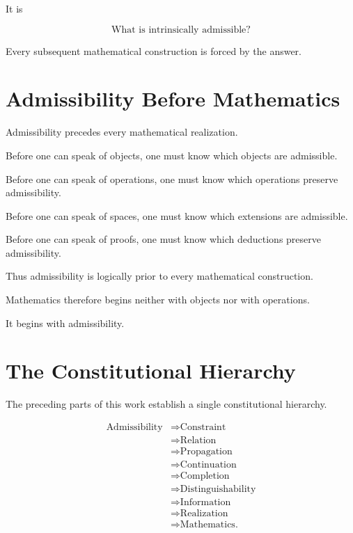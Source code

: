 \documentclass[13pt,openany]{book}
\theoremstyle{plain}
\theoremstyle{definition}
\begin{document}
It is

\[
\boxed{
\text{What is intrinsically admissible?}
}
\]

Every subsequent mathematical construction is forced by the answer.

\section{Admissibility Before Mathematics}

Admissibility precedes every mathematical realization.

Before one can speak of objects, one must know which objects are admissible.

Before one can speak of operations, one must know which operations preserve
admissibility.

Before one can speak of spaces, one must know which extensions are admissible.

Before one can speak of proofs, one must know which deductions preserve
admissibility.

Thus admissibility is logically prior to every mathematical construction.

Mathematics therefore begins neither with objects nor with operations.

It begins with admissibility.

\section{The Constitutional Hierarchy}

The preceding parts of this work establish a single constitutional hierarchy.

\[
\boxed{
\begin{aligned}
\text{Admissibility}
&\Longrightarrow
\text{Constraint}\\
&\Longrightarrow
\text{Relation}\\
&\Longrightarrow
\text{Propagation}\\
&\Longrightarrow
\text{Continuation}\\
&\Longrightarrow
\text{Completion}\\
&\Longrightarrow
\text{Distinguishability}\\
&\Longrightarrow
\text{Information}\\
&\Longrightarrow
\text{Realization}\\
&\Longrightarrow
\text{Mathematics.}
\end{aligned}
}
\]
\end{document}
